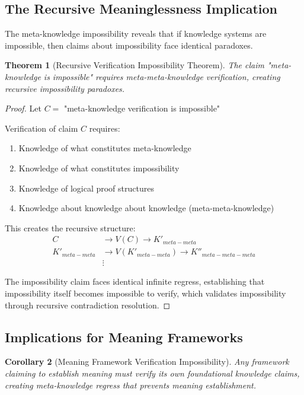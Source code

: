 \documentclass[12pt,a4paper]{article}
\newtheorem{theorem}{Theorem}[section]
\newtheorem{corollary}[theorem]{Corollary}
\begin{document}
\subsection{The Recursive Meaninglessness Implication}

The meta-knowledge impossibility reveals that if knowledge systems are impossible, then claims about impossibility face identical paradoxes.

\begin{theorem}[Recursive Verification Impossibility Theorem]
The claim "meta-knowledge is impossible" requires meta-meta-knowledge verification, creating recursive impossibility paradoxes.
\end{theorem}

\begin{proof}
Let $C =$ "meta-knowledge verification is impossible"

Verification of claim $C$ requires:
\begin{enumerate}
\item Knowledge of what constitutes meta-knowledge
\item Knowledge of what constitutes impossibility  
\item Knowledge of logical proof structures
\item Knowledge about knowledge about knowledge (meta-meta-knowledge)
\end{enumerate}

This creates the recursive structure:
\begin{align}
C &\rightarrow V(C) \rightarrow K'_{meta-meta} \\
K'_{meta-meta} &\rightarrow V(K'_{meta-meta}) \rightarrow K''_{meta-meta-meta} \\
&\vdots
\end{align}

The impossibility claim faces identical infinite regress, establishing that impossibility itself becomes impossible to verify, which validates impossibility through recursive contradiction resolution.
\end{proof}

\subsection{Implications for Meaning Frameworks}

\begin{corollary}[Meaning Framework Verification Impossibility]
Any framework claiming to establish meaning must verify its own foundational knowledge claims, creating meta-knowledge regress that prevents meaning establishment.
\end{corollary}
\end{document}
